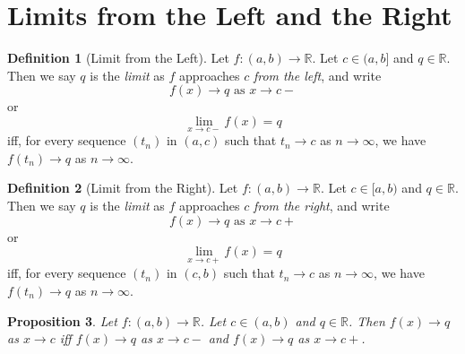 \documentclass{book}
\newtheorem{prop}{Proposition}[chapter]
\theoremstyle{definition}
\newtheorem{df}[prop]{Definition}
\begin{document}
\section{Limits from the Left and the Right}

\begin{df}[Limit from the Left]
Let $f : (a,b) \rightarrow \mathbb{R}$. Let $c \in (a,b]$ and $q \in \mathbb{R}$. Then we say $q$ is the \emph{limit} as $f$ approaches $c$ \emph{from the left}, and write
\[ f(x) \rightarrow q \text{ as } x \rightarrow c- \]
or
\[ \lim_{x \rightarrow c-} f(x) = q \]
iff, for every sequence $(t_n)$ in $(a,c)$ such that $t_n \rightarrow c$ as $n \rightarrow \infty$, we have $f(t_n) \rightarrow q$ as $n \rightarrow \infty$.
\end{df}

\begin{df}[Limit from the Right]
Let $f : (a,b) \rightarrow \mathbb{R}$. Let $c \in [a,b)$ and $q \in \mathbb{R}$. Then we say $q$ is the \emph{limit} as $f$ approaches $c$ \emph{from the right}, and write
\[ f(x) \rightarrow q \text{ as } x \rightarrow c+ \]
or
\[ \lim_{x \rightarrow c+} f(x) = q \]
iff, for every sequence $(t_n)$ in $(c,b)$ such that $t_n \rightarrow c$ as $n \rightarrow \infty$, we have $f(t_n) \rightarrow q$ as $n \rightarrow \infty$.
\end{df}

\begin{prop}
Let $f : (a,b) \rightarrow \mathbb{R}$. Let $c \in (a,b)$ and $q \in \mathbb{R}$. Then $f(x) \rightarrow q$ as $x \rightarrow c$ iff $f(x) \rightarrow q$ as $x \rightarrow c-$ and $f(x) \rightarrow q$ as $x \rightarrow c+$.
\end{prop}
\end{document}
